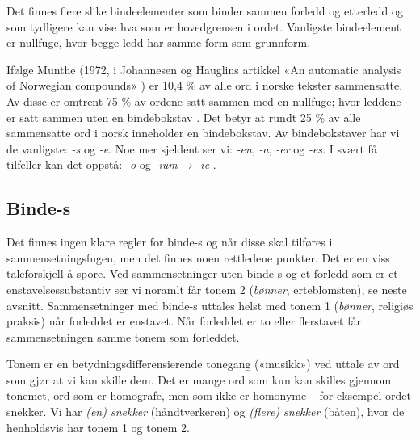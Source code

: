 Det finnes flere slike bindeelementer som binder sammen forledd og etterledd og som tydligere kan vise hva som er hovedgrensen i ordet. Vanligste bindeelement er nullfuge, hvor begge ledd har samme form som grunnform.


Ifølge Munthe (1972, i Johannesen og Hauglins artikkel «An automatic analysis of Norwegian compounds» \cite{johannessen1996automatic}) er 10,4 \% av alle ord i norske tekster sammensatte. Av disse er omtrent 75 \% av ordene satt sammen med en nullfuge; hvor leddene er satt sammen uten en bindebokstav \cite{johannessen1996automatic}. Det betyr at rundt 25 \% av alle sammensatte ord i norsk inneholder en bindebokstav. Av bindebokstaver har vi de vanligste: \textit{-s} og \textit{-e}. Noe mer sjeldent ser vi: \textit{-en}, \textit{-a}, \textit{-er} og \textit{-es}. I svært få tilfeller kan det oppstå: \textit{-o} og \textit{-ium → -ie} \cite{faarlund1997norsk,bindebokstaver}.

\newline
{}\newline
{}\newline
{}\newline
{}\newline
{}\newline
{}\newline
{}\newline

\subsection{Binde-s}
\label{sec:ord-bind1}

Det finnes ingen klare regler for binde-s og når disse skal tilføres i sammensetningsfugen, men det finnes noen rettledene punkter. Det er en viss taleforskjell å spore. Ved sammensetninger uten binde-s og et forledd som er et enstavelsessubstantiv ser vi noramlt får tonem 2 (\textit{bønner}, erteblomsten), se neste avsnitt. Sammensetninger med binde-s uttales helst med tonem 1 (\textit{bønner}, religiøs praksis) når forleddet er enstavet. Når forleddet er to eller flerstavet får sammensetningen samme tonem som forleddet.

Tonem er en betydningsdifferensierende tonegang («musikk») ved uttale av ord som gjør at vi kan skille dem. Det er mange ord som kun kan skilles gjennom tonemet, ord som er homografe, men som ikke er homonyme -- for eksempel ordet snekker. Vi har \textit{(en) snekker} (håndtverkeren) og \textit{(flere) snekker} (båten), hvor de henholdsvis har tonem 1 og tonem 2.

